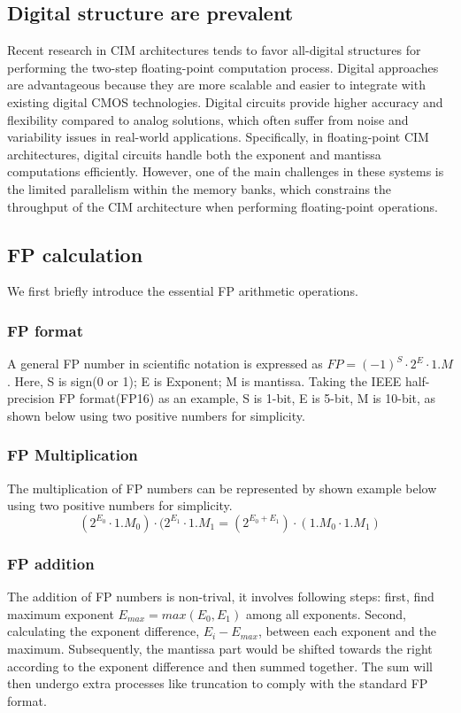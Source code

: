 \subsection{Digital structure are prevalent}
Recent research in CIM architectures tends to favor all-digital structures for performing the two-step floating-point computation process. Digital approaches are advantageous because they are more scalable and easier to integrate with existing digital CMOS technologies. Digital circuits provide higher accuracy and flexibility compared to analog solutions, which often suffer from noise and variability issues in real-world applications. Specifically, in floating-point CIM architectures, digital circuits handle both the exponent and mantissa computations efficiently. However, one of the main challenges in these systems is the limited parallelism within the memory banks, which constrains the throughput of the CIM architecture when performing floating-point operations.
\fi







\iffalse




\subsection{FP calculation}
We first briefly introduce the essential FP arithmetic operations.
\subsubsection{FP format}
A general FP number in scientific notation is expressed as $FP=(-1)^S\cdot2^E\cdot1.M$. Here, S is sign(0 or 1); E is Exponent; M is mantissa. Taking the IEEE half-precision FP format(FP16) as an example, S is 1-bit, E is 5-bit, M is 10-bit, as shown below using two positive numbers for simplicity.

\subsubsection{FP Multiplication}
The multiplication of FP numbers can be represented by shown example below using two positive numbers for simplicity. 
\begin{equation}
    (2^{E_0} \cdot 1.M_0)\cdot(2^{E_1}\cdot1.M_1 = (2^{E_0+E_1})\cdot(1.M_0\cdot1.M_1)
\end{equation}


\subsubsection{FP addition}
The addition of FP numbers is non-trival, it involves following steps: first, find maximum exponent $E_{max} = max{(E_0,E_1)}$ among all exponents. Second, calculating the exponent difference, $E_i - E_{max}$, between each exponent and the maximum. Subsequently, the mantissa part would be shifted towards the right according to the exponent difference and then summed together. The sum will then undergo extra processes like truncation to comply with the standard FP format.  

